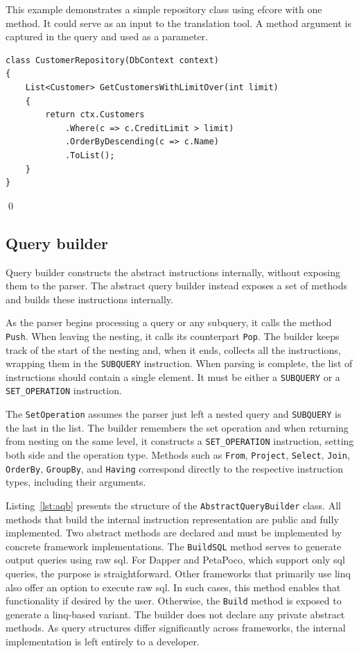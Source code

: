 \begin{example}
\small
This example demonstrates a simple repository class using \acrshort{efcore} with one method. 
It could serve as an input to the translation tool. A method argument is captured in the query and used as a parameter. 
\begin{lstlisting}[language=CSharp]
class CustomerRepository(DbContext context)
{
    List<Customer> GetCustomersWithLimitOver(int limit)
    {
        return ctx.Customers
            .Where(c => c.CreditLimit > limit)
            .OrderByDescending(c => c.Name)
            .ToList();
    }
}
\end{lstlisting}
\qed
\end{example}

\subsection{Query builder}

Query builder constructs the abstract instructions internally, without exposing them to the parser. The abstract query builder instead exposes a set of methods and builds these instructions internally.

As the parser begins processing a query or any subquery, it calls the method \texttt{Push}. When leaving the nesting, it calls its counterpart \texttt{Pop}. The builder keeps track of the start of the nesting and, when it ends, collects all the instructions, wrapping them in the \texttt{SUBQUERY} instruction. When parsing is complete, the list of instructions should contain a single element. It must be either a \texttt{SUBQUERY} or a \texttt{SET\_OPERATION} instruction.

The \texttt{SetOperation} assumes the parser just left a nested query and \texttt{SUBQUERY} is the last in the list. The builder remembers the set operation and when returning from nesting on the same level, it constructs a \texttt{SET\_OPERATION} instruction, setting both side and the operation type.
Methods such as \texttt{From}, \texttt{Project}, \texttt{Select}, \texttt{Join}, \texttt{OrderBy}, \texttt{GroupBy}, and \texttt{Having} correspond directly to the respective instruction types, including their arguments. 

Listing~\ref{lst:aqb} presents the structure of the \texttt{AbstractQueryBuilder} class. All methods that build the internal instruction representation are public and fully implemented. Two abstract methods are declared and must be implemented by concrete framework implementations. The \texttt{BuildSQL} method serves to generate output queries using raw \acrshort{sql}. For Dapper and PetaPoco, which support only \acrshort{sql} queries, the purpose is straightforward. Other frameworks that primarily use \acrshort{linq} also offer an option to execute raw \acrshort{sql}. In such cases, this method enables that functionality if desired by the user. Otherwise, the \texttt{Build} method is exposed to generate a \acrshort{linq}-based variant. The builder does not declare any private abstract methods. As query structures differ significantly across frameworks, the internal implementation is left entirely to a developer.

